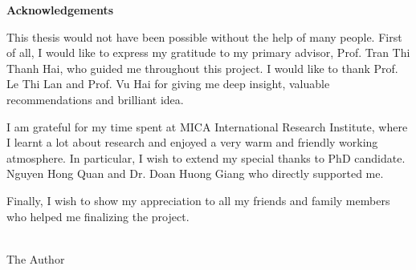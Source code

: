
\cleardoublepage
{}


\begin{center}
\textbf{Acknowledgements}
\end{center}

This thesis would not have been possible without the help of many people.
First of all, I would like to express my gratitude to my primary advisor, Prof. Tran Thi Thanh Hai, who guided me throughout this project.
I would like to thank Prof. Le Thi Lan and Prof. Vu Hai for giving me deep insight, valuable recommendations and brilliant idea.

I am grateful for my time spent at MICA International Research Institute, where I learnt a lot about research and enjoyed a very warm and friendly working atmosphere.
In particular, I wish to extend my special thanks to PhD candidate. Nguyen Hong Quan and Dr. Doan Huong Giang who directly supported me.

Finally, I wish to show my appreciation to all my friends and family members who helped me finalizing the project.
\\\\


\bigskip

\begin{flushright}
\small{The Author\ \ \ }\\
\end{flushright}






